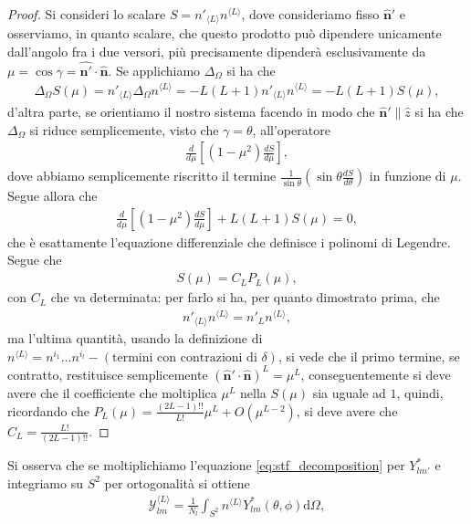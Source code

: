 \begin{proof}
	Si consideri lo scalare $S = n'_{\langle L \rangle}n^{\langle L \rangle}$, dove consideriamo fisso $\hat{\mathbf{n}}'$ e osserviamo, in quanto scalare, che questo prodotto può dipendere unicamente dall'angolo fra i due versori, più precisamente dipenderà esclusivamente da $\mu = \cos{\gamma} = \hat{\mathbf{n}'} \cdot \hat{\mathbf{n}}$. Se applichiamo $\Delta_\Omega$ si ha che
	\begin{align}
		\Delta_\Omega S(\mu) = n'_{\langle L \rangle} \Delta_\Omega n^{\langle L \rangle} = -L(L+1) n'_{\langle L \rangle} n^{\langle L \rangle} = -L(L+1) S(\mu),
	\end{align}
	d'altra parte, se orientiamo il nostro sistema facendo in modo che $\hat{\mathbf{n}}' \parallel \hat{z}$ si ha che $\Delta_\Omega$ si riduce semplicemente, visto che $\gamma = \theta$, all'operatore 
	\begin{align}
		\frac{d}{d\mu} \left[ (1-\mu^2) \frac{dS}{d\mu} \right],
	\end{align}
	dove abbiamo semplicemente riscritto il termine $\frac{1}{\sin{\theta}}(\sin{\theta} \frac{dS}{d\theta})$ in funzione di $\mu$. Segue allora che
	\begin{align}
		\frac{d}{d\mu}\left[ (1-\mu^2) \frac{dS}{d\mu} \right] + L(L+1)S(\mu) = 0,
	\end{align}
	che è esattamente l'equazione differenziale che definisce i polinomi di Legendre. Segue che
	\begin{align}
		S(\mu) = C_L P_L(\mu),
	\end{align}
	con $C_L$ che va determinata: per farlo si ha, per quanto dimostrato prima, che
	\begin{align}
		n'_{\langle L \rangle} n^{\langle L \rangle} = n'_{L} n^{\langle L \rangle},
	\end{align}
	ma l'ultima quantità, usando la definizione di $n^{\langle L \rangle} = n^{i_1} \ldots n^{i_l} - (\text{termini con contrazioni di } \delta)$, si vede che il primo termine, se contratto, restituisce semplicemente $(\hat{\mathbf{n}}' \cdot \hat{\mathbf{n}})^L = \mu^L$, conseguentemente si deve avere che il coefficiente che moltiplica $\mu^L$ nella $S(\mu)$ sia uguale ad $1$, quindi, ricordando che $P_L(\mu) = \frac{(2L-1)!!}{L!} \mu^L + O(\mu^{L-2})$, si deve avere che $C_L = \frac{L!}{(2L-1)!!}$.
\end{proof}
Si osserva che se moltiplichiamo l'equazione \eqref{eq:stf_decomposition} per $Y_{lm'}^*$ e integriamo su $S^2$ per ortogonalità si ottiene
\begin{align}
	\mathcal{Y}_{lm}^{\langle L \rangle} = \frac{1}{N_l} \int_{S^2} n^{\langle L \rangle} Y_{lm}^*(\theta, \phi) \mathrm{d}\Omega,
\end{align}
